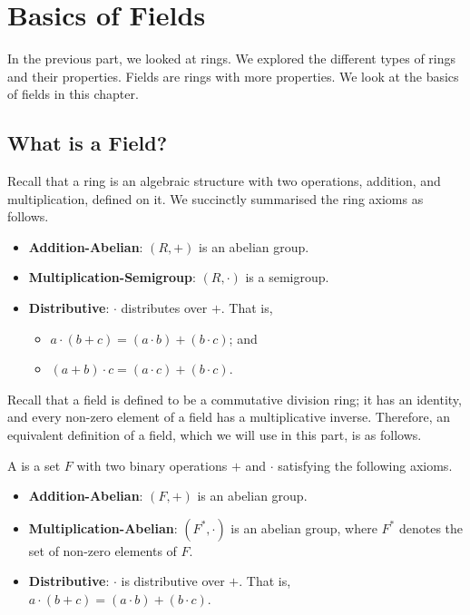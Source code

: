 \chapter{Basics of Fields}
In the previous part, we looked at rings. We explored the different types of rings and their properties. Fields are rings with more properties. We look at the basics of fields in this chapter.

\section{What is a Field?}
Recall that a ring is an algebraic structure with two operations, addition, and multiplication, defined on it. We succinctly summarised the ring axioms as follows.
\begin{itemize}
    \item \textbf{Addition-Abelian}: $(R, +)$ is an abelian group.
    \item \textbf{Multiplication-Semigroup}: $(R, \cdot)$ is a semigroup.
    \item \textbf{Distributive}: $\cdot$ distributes over $+$. That is,
    \begin{itemize}
        \item $a \cdot (b + c) = (a \cdot b) + (b \cdot c)$; and
        \item $(a + b) \cdot c = (a \cdot c) + (b \cdot c)$.
    \end{itemize}
\end{itemize}

Recall that a field is defined to be a commutative division ring; it has an identity, and every non-zero element of a field has a multiplicative inverse. Therefore, an equivalent definition of a field, which we will use in this part, is as follows.
\begin{definition}
    A  is a set $F$ with two binary operations $+$ and $\cdot$ satisfying the following axioms.
    \begin{itemize}
        \item \textbf{Addition-Abelian}: $(F, +)$ is an abelian group.
        \item \textbf{Multiplication-Abelian}: $(F^\ast, \cdot)$ is an abelian group, where $F^\ast$ denotes the set of non-zero elements of $F$.
        \item \textbf{Distributive}: $\cdot$ is distributive over $+$. That is, $a \cdot (b + c) = (a \cdot b) + (b \cdot c)$.
    \end{itemize}
\end{definition}

